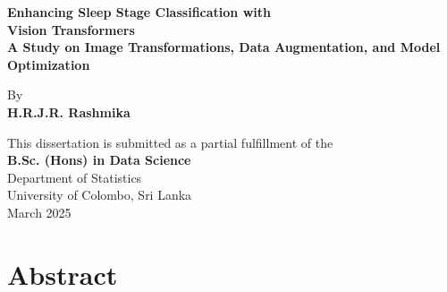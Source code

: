 \documentclass[12pt]{report}
\begin{document}
\begin{titlepage}
    \centering

    
    {\fontsize{16pt}{19pt}\selectfont \textbf{Enhancing Sleep Stage Classification with}}\\
    {\fontsize{16pt}{19pt}\selectfont \textbf{Vision Transformers}} \\ [0.4 cm]
    {\fontsize{16pt}{19pt}\selectfont \textbf{A Study on Image Transformations, Data Augmentation, and Model Optimization}}\\

    \vfill

    
    {\fontsize{12pt}{15pt}\selectfont By}\\
    {\fontsize{14pt}{17pt}\selectfont \textbf{H.R.J.R. Rashmika}}\\

    \vfill
    
    \fontsize{12pt}{14pt}\selectfont This dissertation is submitted as a partial fulfillment of the\\
    {\fontsize{12pt}{14pt}\selectfont \textbf{B.Sc. (Hons) in Data Science}}\\ [1 cm]

    
    {\fontsize{14pt}{17pt}\selectfont Department of Statistics}\\
    {\fontsize{14pt}{17pt}\selectfont University of Colombo, Sri Lanka}\\ [1 cm]

    
    {\fontsize{12pt}{14pt}\selectfont March 2025}\\

\end{titlepage}







\chapter*{Abstract}
\end{document}
